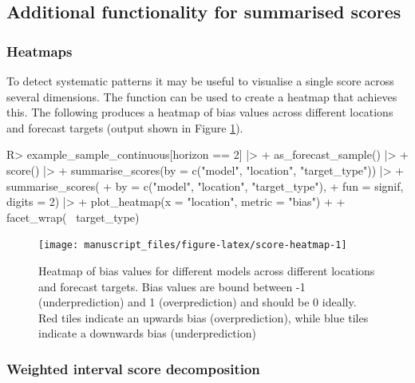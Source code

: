 \documentclass[
]{jss}
\begin{document}
\subsection{Additional functionality for summarised
scores}\label{additional-functionality-for-summarised-scores}

\subsubsection{Heatmaps}\label{heatmaps}

To detect systematic patterns it may be useful to visualise a single
score across several dimensions. The function  can
be used to create a heatmap that achieves this. The following produces a
heatmap of bias values across different locations and forecast targets
(output shown in Figure \ref{fig:score-heatmap}).

\begin{CodeChunk}
\begin{CodeInput}
R> example_sample_continuous[horizon == 2] |>
+   as_forecast_sample() |>
+   score() |>
+   summarise_scores(by = c("model", "location", "target_type")) |>
+   summarise_scores(
+     by = c("model", "location", "target_type"), 
+     fun = signif, digits = 2) |>
+   plot_heatmap(x = "location", metric = "bias") + 
+     facet_wrap(~ target_type) 
\end{CodeInput}
\begin{figure}[!h]

{\centering \texttt{[image: manuscript\_files/figure-latex/score-heatmap-1]} 

}

\caption[Heatmap of bias values for different models across different locations and forecast targets]{Heatmap of bias values for different models across different locations and forecast targets. Bias values are bound between -1 (underprediction) and 1 (overprediction) and should be 0 ideally. Red tiles indicate an upwards bias (overprediction), while blue tiles indicate a downwards bias (underprediction)}\label{fig:score-heatmap}
\end{figure}
\end{CodeChunk}

\subsubsection{Weighted interval score
decomposition}\label{weighted-interval-score-decomposition}
\end{document}
